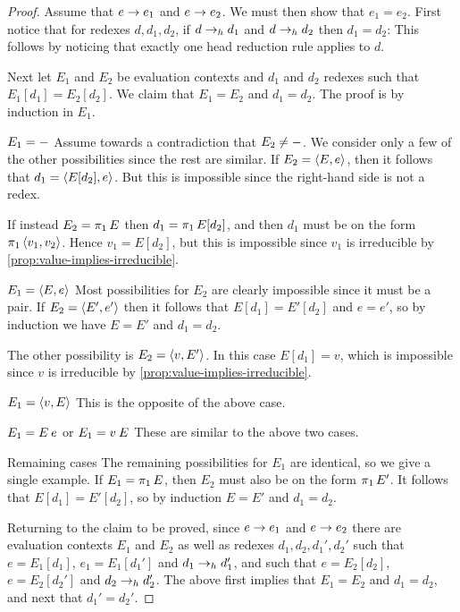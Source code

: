 \begin{proof}
    Assume that $e \to e_1$ and $e \to e_2$. We must then show that $e_1 = e_2$. First notice that for redexes $d,d_1,d_2$, if $d \to_h d_1$ and $d \to_h d_2$ then $d_1 = d_2$: This follows by noticing that exactly one head reduction rule applies to $d$.
    
    Next let $E_1$ and $E_2$ be evaluation contexts and $d_1$ and $d_2$ redexes such that $E_1[d_1] = E_2[d_2]$. We claim that $E_1 = E_2$ and $d_1 = d_2$. The proof is by induction in $E_1$.
    \begin{proofsec}
        \item[$E_1 = {-}$]
        Assume towards a contradiction that $E_2 \neq {-}$. We consider only a few of the other possibilities since the rest are similar. If $E_2 = \langle\textcolor{black}{E},\textcolor{black}{e}\rangle$, then it follows that $d_1 = \langle\textcolor{black}{E[d_2]},\textcolor{black}{e}\rangle$. But this is impossible since the right-hand side is not a redex.
        
        If instead $E_2 = \expProjl{E}$ then $d_1 = \expProjl{E[d_2]}$, and then $d_1$ must be on the form $\expProjl{\expPair{v_1}{v_2}}$. Hence $v_1 = E[d_2]$, but this is impossible since $v_1$ is irreducible by \cref{prop:value-implies-irreducible}.

        \item[$E_1 = \langle\textcolor{black}{E},\textcolor{black}{e}\rangle$]
        Most possibilities for $E_2$ are clearly impossible since it must be a pair. If $E_2 = \langle\textcolor{black}{E'},\textcolor{black}{e'}\rangle$ then it follows that $E[d_1] = E'[d_2]$ and $e = e'$, so by induction we have $E = E'$ and $d_1 = d_2$.

        The other possibility is $E_2 = \langle\textcolor{black}{v},\textcolor{black}{E'}\rangle$. In this case $E[d_1] = v$, which is impossible since $v$ is irreducible by \cref{prop:value-implies-irreducible}.

        \item[$E_1 = \langle\textcolor{black}{v},\textcolor{black}{E}\rangle$]
        This is the opposite of the above case.

        \item[$E_1 = \expApp{E}{e}$ or $E_1 = \expApp{v}{E}$]
        These are similar to the above two cases.

        \item[Remaining cases]
        The remaining possibilities for $E_1$ are identical, so we give a single example. If $E_1 = \expProjl{E}$, then $E_2$ must also be on the form $\expProjl{E'}$. It follows that $E[d_1] = E'[d_2]$, so by induction $E = E'$ and $d_1 = d_2$.
    \end{proofsec}
    Returning to the claim to be proved, since $e \to e_1$ and $e \to e_2$ there are evaluation contexts $E_1$ and $E_2$ as well as redexes $d_1,d_2,d_1',d_2'$ such that $e = E_1[d_1]$, $e_1 = E_1[d_1']$ and $d_1 \to_h d_1'$, and such that $e = E_2[d_2]$, $e = E_2[d_2']$ and $d_2 \to_h d_2'$. The above first implies that $E_1 = E_2$ and $d_1 = d_2$, and next that $d_1' = d_2'$.
\end{proof}


